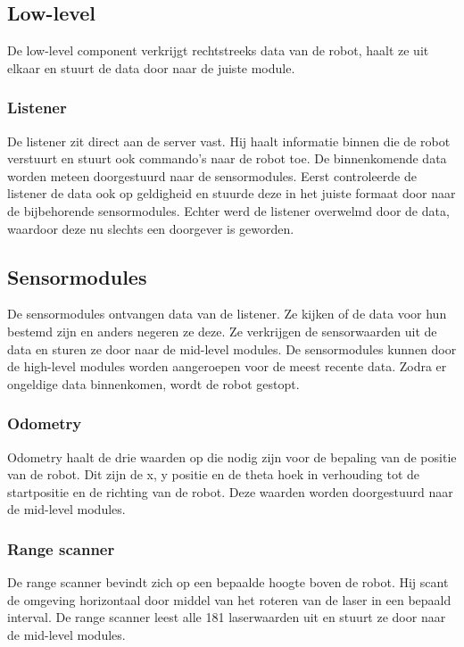 \documentclass[a4paper,10pt]{article}
\begin{document}
\subsection{Low-level}
De low-level component verkrijgt rechtstreeks data van de robot, haalt ze uit elkaar en stuurt de data door naar de juiste module.

\subsubsection{Listener}
De listener zit direct aan de server vast. Hij haalt informatie binnen die de robot verstuurt en stuurt ook commando's naar de robot toe. De binnenkomende data worden meteen doorgestuurd naar de sensormodules. Eerst controleerde de listener de data ook op geldigheid en stuurde deze in het juiste formaat door naar de bijbehorende sensormodules. Echter werd de listener overwelmd door de data, waardoor deze nu slechts een doorgever is geworden.

\subsection{Sensormodules}
De sensormodules ontvangen data van de listener. Ze kijken of de data voor hun bestemd zijn en anders negeren ze deze. Ze verkrijgen de sensorwaarden uit de data en sturen ze door naar de mid-level modules. De sensormodules kunnen door de high-level modules worden aangeroepen voor de meest recente data. Zodra er ongeldige data binnenkomen, wordt de robot gestopt.

\subsubsection{Odometry}
Odometry haalt de drie waarden op die nodig zijn voor de bepaling van de positie van de robot. Dit zijn de x, y positie en de theta hoek in verhouding tot de startpositie en de richting van de robot. Deze waarden worden doorgestuurd naar de mid-level modules.

\subsubsection{Range scanner}
De range scanner bevindt zich op een bepaalde hoogte boven de robot. Hij scant de omgeving horizontaal door middel van het roteren van de laser in een bepaald interval. De range scanner leest alle 181 laserwaarden uit en stuurt ze door naar de mid-level modules. 
\end{document}
